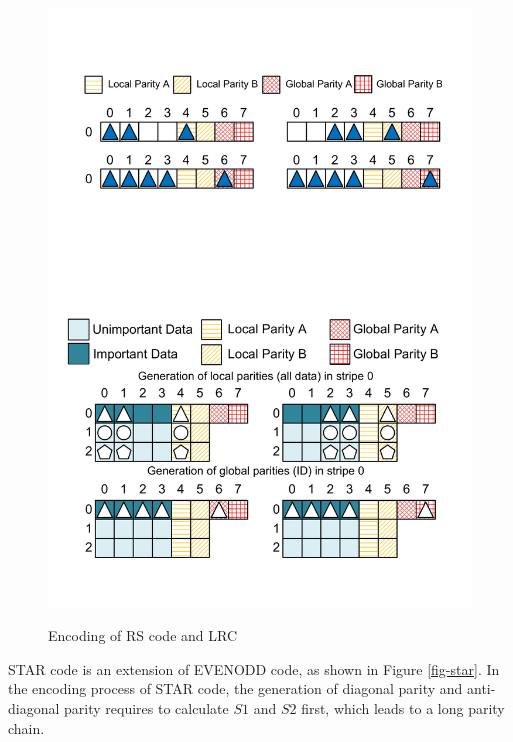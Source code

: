 \documentclass[sigconf]{acmart}
\begin{document}
\begin{figure}
{    \includegraphics[width=0.8\linewidth]{photo/LRC-1.pdf}\label{fig-LRC-1}
}\vspace{-3mm}
\caption{Encoding of RS code and LRC}
\vspace{-3mm}
\end{figure}

STAR code \cite{STAR} is an extension of EVENODD \cite{EVENODD} code, as shown in Figure \ref{fig-star}.
In the encoding process of STAR code, the generation of diagonal parity and anti-diagonal parity requires to calculate $S1$ and $S2$ first, which leads to a long parity chain.
\end{document}
